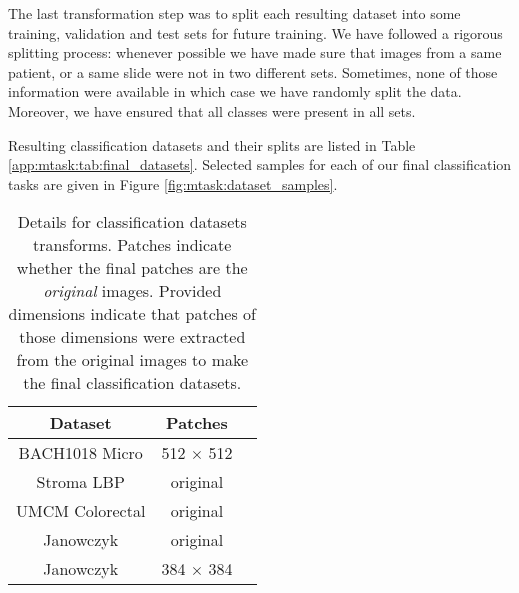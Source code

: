 The last transformation step was to split each resulting dataset into some training, validation and test sets for future training. We have followed a rigorous splitting process: whenever possible we have made sure that images from a same patient, or a same slide were not in two different sets. Sometimes, none of those information were available in which case we have randomly split the data. Moreover, we have ensured that all classes were present in all sets.

Resulting classification datasets and their splits are listed in Table \ref{app:mtask:tab:final_datasets}. Selected samples for each of our final classification tasks are given in Figure \ref{fig:mtask:dataset_samples}.

\begin{table}
  \centering
  \tiny
  \begin{tabular}{|c|c|c|}
  \hline
  Dataset & Patches \\
  \hline
  BACH1018 Micro & 512 $\times$ 512 \\
  Stroma LBP & original \\
  UMCM Colorectal & original \\
  Janowczyk & original \\ 
  Janowczyk & 384 $\times$ 384 \\
  \hline
  \end{tabular}
  \caption{Details for classification datasets transforms. Patches indicate whether the final patches are the \textit{original} images. Provided dimensions indicate that patches of those dimensions were extracted from the original images to make the final classification datasets.}
  \label{app:mtask:tab:details_trans_clf}
\end{table}

